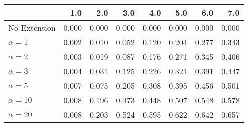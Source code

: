 \begin{tabular}{lrrrrrrr}
\toprule
{} &   1.0 &   2.0 &   3.0 &   4.0 &   5.0 &   6.0 &   7.0 \\
\midrule
No Extension  & 0.000 & 0.000 & 0.000 & 0.000 & 0.000 & 0.000 & 0.000 \\
$\alpha = 1$  & 0.002 & 0.010 & 0.052 & 0.120 & 0.204 & 0.277 & 0.343 \\
$\alpha = 2$  & 0.003 & 0.019 & 0.087 & 0.176 & 0.271 & 0.345 & 0.406 \\
$\alpha = 3$  & 0.004 & 0.031 & 0.125 & 0.226 & 0.321 & 0.391 & 0.447 \\
$\alpha = 5$  & 0.007 & 0.075 & 0.205 & 0.308 & 0.395 & 0.456 & 0.501 \\
$\alpha = 10$ & 0.008 & 0.196 & 0.373 & 0.448 & 0.507 & 0.548 & 0.578 \\
$\alpha = 20$ & 0.008 & 0.203 & 0.524 & 0.595 & 0.622 & 0.642 & 0.657 \\
\bottomrule
\end{tabular}
